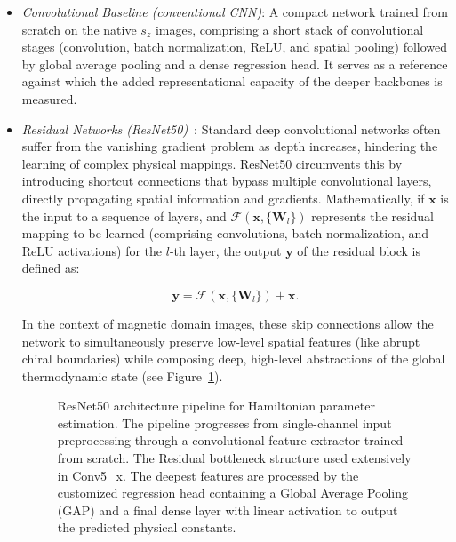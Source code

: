 \documentclass[letterpaper, 12, one column]{article}
\begin{document}
\begin{itemize}

\item[--] \emph{Convolutional Baseline (conventional CNN)}: A compact network trained from scratch on the native $s_z$ images, comprising a short stack of convolutional stages (convolution, batch normalization, ReLU, and spatial pooling) followed by global average pooling and a dense regression head. It serves as a reference against which the added representational capacity of the deeper backbones is measured.

\item[--] \emph{Residual Networks (ResNet50)}~\cite{koonce2021resnet}: Standard deep convolutional networks often suffer from the vanishing gradient problem as depth increases, hindering the learning of complex physical mappings. ResNet50 circumvents this by introducing shortcut connections that bypass multiple convolutional layers, directly propagating spatial information and gradients. Mathematically, if $\mathbf{x}$ is the input to a sequence of layers, and $\mathcal{F}(\mathbf{x}, \{\mathbf{W}_l\})$ represents the residual mapping to be learned (comprising convolutions, batch normalization, and ReLU activations) for the $l$-th layer, the output $\mathbf{y}$ of the residual block is defined as:

\begin{equation}\label{eq:ResNet}
\mathbf{y} = \mathcal{F}(\mathbf{x}, \{\mathbf{W}_l\}) + \mathbf{x}.
\end{equation}

In the context of magnetic domain images, these skip connections allow the network to simultaneously preserve low-level spatial features (like abrupt chiral boundaries) while composing deep, high-level abstractions of the global thermodynamic state (see Figure~\ref{fig:resnet_implementation}).

\begin{figure}[H]
    \centering
    \resizebox{\linewidth}{!}{
    }
\caption{ResNet50 architecture pipeline for Hamiltonian parameter estimation. The pipeline progresses from single-channel input preprocessing through a convolutional feature extractor trained from scratch. The Residual bottleneck structure used extensively in Conv5\_x. The deepest features are processed by the customized regression head containing a Global Average Pooling (GAP) and a final dense layer with linear activation to output the predicted physical constants.}
\label{fig:resnet_implementation}
\end{figure}


\end{itemize}
\end{document}
